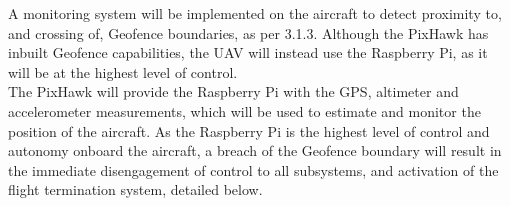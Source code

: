 A monitoring system will be implemented on the aircraft to detect proximity to, and crossing of, Geofence boundaries, as per 3.1.3. Although the PixHawk has inbuilt Geofence capabilities, the UAV will instead use the Raspberry Pi, as it will be at the highest level of control.\\

The PixHawk will provide the Raspberry Pi with the GPS, altimeter and accelerometer measurements, which will be used to estimate and monitor the position of the aircraft. As the Raspberry Pi is the highest level of control and autonomy onboard the aircraft, a breach of the Geofence boundary will result in the immediate disengagement of control to all subsystems, and activation of the flight termination system, detailed below.
